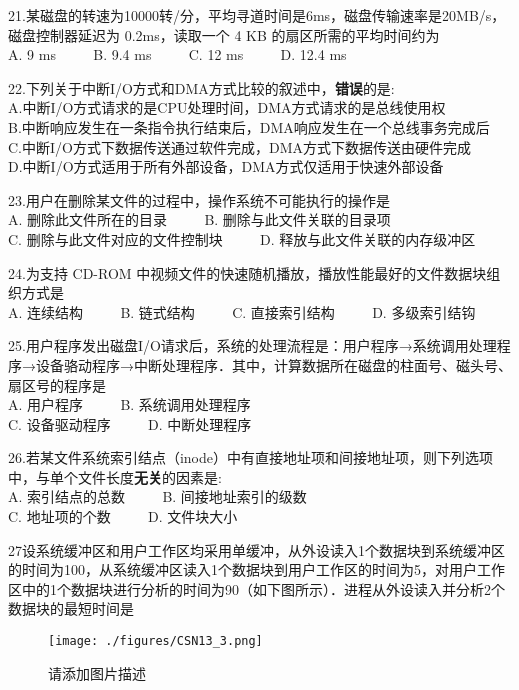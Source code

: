 21.某磁盘的转速为10000转/分，平均寻道时间是6ms，磁盘传输速率是20MB/s，磁盘控制器延迟为 0.2ms，读取一个 4 KB 的扇区所需的平均时间约为 \\
A. 9 ms $\qquad$ B. 9.4 ms $\qquad$ C. 12 ms $\qquad$ D. 12.4 ms

22.下列关于中断I/O方式和DMA方式比较的叙述中，\textbf{错误}的是: \\
A.中断I/O方式请求的是CPU处理时间，DMA方式请求的是总线使用权 \\
B.中断响应发生在一条指令执行结束后，DMA响应发生在一个总线事务完成后 \\
C.中断I/O方式下数据传送通过软件完成，DMA方式下数据传送由硬件完成 \\
D.中断I/O方式适用于所有外部设备，DMA方式仅适用于快速外部设备

23.用户在删除某文件的过程中，操作系统不可能执行的操作是 \\
A. 删除此文件所在的目录 $\qquad$ B. 删除与此文件关联的目录项 \\
C. 删除与此文件对应的文件控制块 $\qquad$ D. 释放与此文件关联的内存级冲区

24.为支持 CD-ROM 中视频文件的快速随机播放，播放性能最好的文件数据块组织方式是 \\
A. 连续结构 $\qquad$ B. 链式结构 $\qquad$ C. 直接索引结构 $\qquad$ D. 多级索引结钩

25.用户程序发出磁盘I/O请求后，系统的处理流程是：用户程序→系统调用处理程序→设备骆动程序→中断处理程序．其中，计算数据所在磁盘的柱面号、磁头号、扇区号的程序是 \\
A. 用户程序 $\qquad$ B. 系统调用处理程序 \\
C. 设备驱动程序 $\qquad$ D. 中断处理程序

26.若某文件系统索引结点（inode）中有直接地址项和间接地址项，则下列选项中，与单个文件长度\textbf{无关}的因素是: \\
A. 索引结点的总数 $\qquad$ B. 间接地址索引的级数 \\
C. 地址项的个数 $\qquad$ D. 文件块大小

27设系统缓冲区和用户工作区均采用单缓冲，从外设读入1个数据块到系统缓冲区的时间为100，从系统缓冲区读入1个数据块到用户工作区的时间为5，对用户工作区中的1个数据块进行分析的时间为90（如下图所示）．进程从外设读入并分析2个数据块的最短时间是 \\
\begin{figure}[ht]
\centering
\texttt{[image: ./figures/CSN13\_3.png]}
\caption{请添加图片描述} \label{CSN13_fig3}
\end{figure}